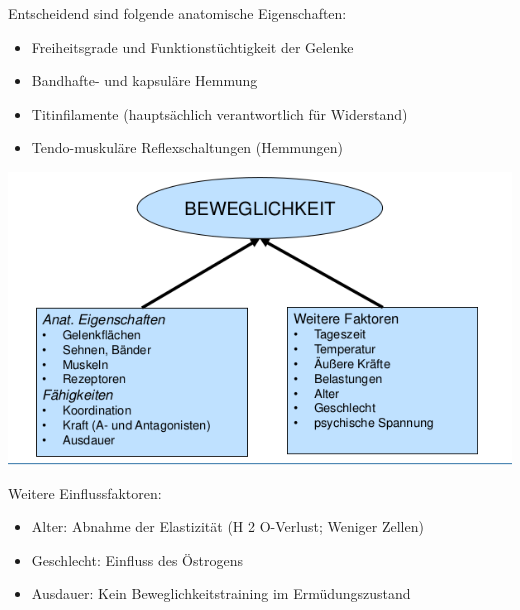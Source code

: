 \begin{minipage}{0.4\textwidth}
Entscheidend sind folgende anatomische Eigenschaften:
\begin{itemize}
    \item Freiheitsgrade und Funktionstüchtigkeit der Gelenke
    \item Bandhafte- und kapsuläre Hemmung
    \item Titinfilamente (hauptsächlich verantwortlich für Widerstand)
    \item Tendo-muskuläre Reflexschaltungen (Hemmungen)
\end{itemize}
\end{minipage}
\begin{minipage}{0.6\textwidth}
\includegraphics[width=\textwidth]{pictures/beweg_determinanten}
\end{minipage}
Weitere Einflussfaktoren:
\begin{itemize}
    \item Alter: Abnahme der Elastizität (H 2 O-Verlust; Weniger Zellen)
    \item Geschlecht: Einfluss des Östrogens
    \item Ausdauer: Kein Beweglichkeitstraining im Ermüdungszustand
\end{itemize}

